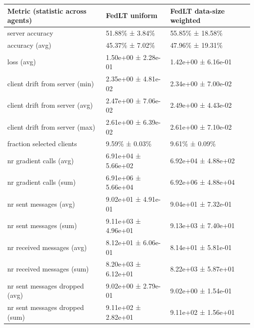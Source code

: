 \begin{tabular}{lll}
\hline
 Metric (statistic across agents)   & FedLT uniform       & FedLT data-size weighted   \\
\hline
 server accuracy                    & 51.88\% ± 3.84\%      & 55.85\% ± 18.58\%            \\
 accuracy (avg)                     & 45.37\% ± 7.02\%      & 47.96\% ± 19.31\%            \\
 loss (avg)                         & 1.50e+00 ± 2.28e-01 & 1.42e+00 ± 6.16e-01        \\
 client drift from server (min)     & 2.35e+00 ± 4.81e-02 & 2.34e+00 ± 7.00e-02        \\
 client drift from server (avg)     & 2.47e+00 ± 7.06e-02 & 2.49e+00 ± 4.43e-02        \\
 client drift from server (max)     & 2.61e+00 ± 6.39e-02 & 2.61e+00 ± 7.10e-02        \\
 fraction selected clients          & 9.59\% ± 0.03\%       & 9.61\% ± 0.09\%              \\
 nr gradient calls (avg)            & 6.91e+04 ± 5.66e+02 & 6.92e+04 ± 4.88e+02        \\
 nr gradient calls (sum)            & 6.91e+06 ± 5.66e+04 & 6.92e+06 ± 4.88e+04        \\
 nr sent messages (avg)             & 9.02e+01 ± 4.91e-01 & 9.04e+01 ± 7.32e-01        \\
 nr sent messages (sum)             & 9.11e+03 ± 4.96e+01 & 9.13e+03 ± 7.40e+01        \\
 nr received messages (avg)         & 8.12e+01 ± 6.06e-01 & 8.14e+01 ± 5.81e-01        \\
 nr received messages (sum)         & 8.20e+03 ± 6.12e+01 & 8.22e+03 ± 5.87e+01        \\
 nr sent messages dropped (avg)     & 9.02e+00 ± 2.79e-01 & 9.02e+00 ± 1.54e-01        \\
 nr sent messages dropped (sum)     & 9.11e+02 ± 2.82e+01 & 9.11e+02 ± 1.56e+01        \\
\hline
\end{tabular}